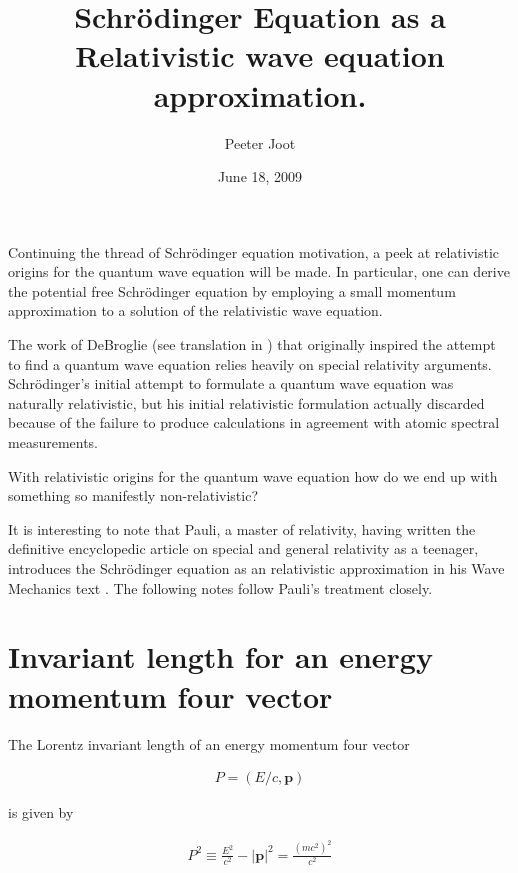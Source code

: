 \documentclass[]{eliblog}
\title{Schr\"{o}dinger Equation as a Relativistic wave equation approximation.}
\author{Peeter Joot}
\date{June 18, 2009}
\newcommand{\Abs}[1]{{\left\lvert{#1}\right\rvert}}
\newcommand{\Bp}[0]{\mathbf{p}}
\begin{document}
\maketitle

Continuing the thread of Schr\"{o}dinger equation motivation, a
peek at relativistic origins for the quantum wave equation will be
made.  In particular, one can derive
the potential free Schr\"{o}dinger equation by employing
a small momentum approximation to a solution 
of the relativistic wave equation.

The work of DeBroglie (see translation in \cite{AFkracklauerDeBroglie}) 
that originally inspired the attempt to find a quantum wave equation
relies heavily on special relativity arguments.  
Schr\"{o}dinger's initial attempt to formulate a quantum wave equation
was naturally relativistic, but his initial relativistic formulation 
actually discarded because of the failure to produce calculations in agreement
with atomic spectral measurements.

With relativistic origins for the quantum wave equation how do we end up
with something so manifestly non-relativistic?

It is interesting to note that Pauli, a master of relativity, having
written the definitive encyclopedic article 
\cite{pauli1981tr}
on special and general relativity
as a teenager, introduces the 
Schr\"{o}dinger equation as an relativistic approximation in his
Wave Mechanics text \cite{pauli2000wm}.  The following notes follow Pauli's treatment closely.

\section{Invariant length for an energy momentum four vector}

The Lorentz invariant length of an energy momentum four vector 

\begin{align}
P = (E/c, \Bp)
\end{align}

is given by

\begin{align}\label{eqn:Psquared}
P^2 \equiv \frac{E^2}{c^2} - \Abs{\Bp}^2 = \frac{(m c^2)^2}{c^2}
\end{align}
\end{document}
